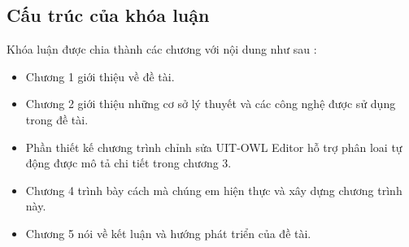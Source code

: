 \subsection{Cấu trúc của khóa luận}
Khóa luận được chia thành các chương với nội dung như sau : 
\begin{itemize}
\item Chương 1 giới thiệu về đề tài.
\item Chương 2 giới thiệu những cơ sở lý thuyết và các công nghệ được sử dụng trong đề tài.
\item Phần thiết kế chương trình chỉnh sửa UIT-OWL Editor hỗ trợ phân loai tự động được mô tả chi tiết trong chương 3.
\item Chương 4 trình bày cách mà chúng em hiện thực và xây dựng chương trình này.
\item Chương 5 nói về kết luận và hướng phát triển của đề tài.
\end{itemize}
